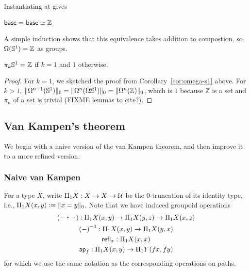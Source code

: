 Instantiating at {\base} gives
\begin{cor}\label{cor:omega-s1}
$\eqv {\id{\base}{\base}} {\mathbb{Z}}$
\end{cor}

A simple induction shows that this equivalence takes addition to
compostion, so $\Omega(\Sn ^1) = \mathbb{Z}$ as groups.  

\begin{cor}
$\id{\pi_k{\Sn ^1}} {\mathbb{Z}}$ if $k = 1$ and $1$ otherwise.  
\end{cor}
\begin{proof}
For $k=1$, we sketched the proof from Corollary~\ref{cor:omega-s1} above.
For $k > 1$, $\trunc 0 {\Omega^{n+1}(\Sn ^1)} = \trunc 0
{\Omega^n(\Omega{\Sn ^1})} = \trunc 0 {\Omega^n(\mathbb{Z})}$, which is
  $1$ because $\mathbb{Z}$ is a set and $\pi_n$ of a set is trivial (FIXME
  lemmas to cite?).
\end{proof}


\subsection{Van Kampen's theorem}
\label{sec:van-kampen}

We begin with a naive version of the van Kampen theorem, and then improve it to a more refined version.

\subsubsection{Naive van Kampen}
\label{sec:naive}

For a type $X$, write $\Pi_1 X: X\to X\to \type$ be the $0$-truncation of its identity type, i.e., $\Pi_1 X(x,y) \defeq \trunc0{x=y}$.
Note that we have induced groupoid operations
\begin{gather*}
  (-\ct-) : \Pi_1X(x,y) \to \Pi_1X(y,z) \to \Pi_1X(x,z)\\
  \opp{(-)} : \Pi_1X(x,y) \to \Pi_1X(y,x)\\
  \refl{x} : \Pi_1X(x,x)\\
  \apfunc{f} : \Pi_1X(x,y) \to \Pi_1Y(fx,fy)
\end{gather*}
for which we use the same notation as the corresponding operations on paths.

